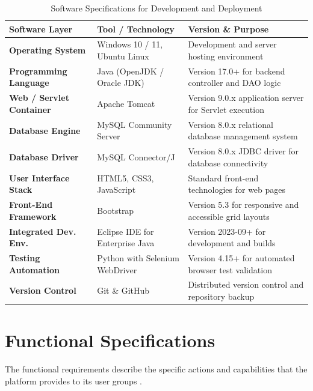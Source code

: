 \documentclass[12pt,a4paper]{report}
\begin{document}
\begin{table}[H]
\centering
\small
\caption{Software Specifications for Development and Deployment}
\label{tab:software_specs}
\begin{tabularx}{\textwidth}{|L{3.5cm}|L{4.0cm}|J|}
\hline
\textbf{Software Layer} & \textbf{Tool / Technology} & \textbf{Version \& Purpose} \\ \hline
\textbf{Operating System} & Windows 10 / 11, Ubuntu Linux & Development and server hosting environment \\ \hline
\textbf{Programming Language} & Java (OpenJDK / Oracle JDK) & Version 17.0+ for backend controller and DAO logic \\ \hline
\textbf{Web / Servlet Container} & Apache Tomcat & Version 9.0.x application server for Servlet execution \\ \hline
\textbf{Database Engine} & MySQL Community Server & Version 8.0.x relational database management system \\ \hline
\textbf{Database Driver} & MySQL Connector/J & Version 8.0.x JDBC driver for database connectivity \\ \hline
\textbf{User Interface Stack} & HTML5, CSS3, JavaScript & Standard front-end technologies for web pages \\ \hline
\textbf{Front-End Framework} & Bootstrap & Version 5.3 for responsive and accessible grid layouts \\ \hline
\textbf{Integrated Dev. Env.} & Eclipse IDE for Enterprise Java & Version 2023-09+ for development and builds \\ \hline
\textbf{Testing Automation} & Python with Selenium WebDriver & Version 4.15+ for automated browser test validation \\ \hline
\textbf{Version Control} & Git \& GitHub & Distributed version control and repository backup \\ \hline
\end{tabularx}
\end{table}

\section{Functional Specifications}
The functional requirements describe the specific actions and capabilities that the platform provides to its user groups \cite{sommerville}.
\end{document}
